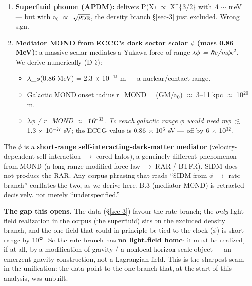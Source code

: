 \documentclass[aps,prd,preprint,nofootinbib,superscriptaddress]{revtex4-2}
\providecommand{\tightlist}{\setlength{\itemsep}{0pt}\setlength{\parskip}{0pt}}
\begin{document}
\begin{enumerate}
\def\labelenumi{\arabic{enumi}.}
\tightlist
\item
  \textbf{Superfluid phonon (APDM):} delivers P(X) \(\propto\)
  X\^{}\{3/2\} with \(\Lambda\) \(\sim\) meV
  \citep{Berezhiani:2015bqa, Berezhiani:2015pia} --- but with a\(_{0}\)
  \(\propto\) \(\sqrt{\rho_{\rm DE}}\), the density branch §\ref{sec-3}
  just excluded. Wrong sign.
\item
  \textbf{Mediator-MOND from ECCG's dark-sector scalar \(\phi\) (mass
  0.86 MeV):} a massive scalar mediates a Yukawa force of range
  \(\lambda\)\emph{\(\phi\) = ℏc/m}\(\phi\)c\(^{2}\). We derive
  numerically (D-3):

  \begin{itemize}
  \tightlist
  \item
    \(\lambda\)\_\(\phi\)(0.86 MeV) = 2.3 × 10\(^{-13}\) m --- a
    nuclear/contact range.
  \item
    Galactic MOND onset radius r\_MOND = \surd (GM/a\(_{0}\))
    \(\approx\) 3--11 kpc \(\approx\) 10\(^{20}\) m.
  \item
    \(\lambda\)\emph{\(\phi\) / r\_MOND \(\approx\)
    \textbf{10\(^{-33}\)}. To reach galactic range \(\phi\) would need
    m}\(\phi\) \(\lesssim\) 1.3 × 10\(^{-27}\) eV; the ECCG value is
    0.86 × 10\(^{6}\) eV --- off by 6 × 10\(^{32}\).
  \end{itemize}
\end{enumerate}

The \(\phi\) is a \textbf{short-range self-interacting-dark-matter
mediator} (velocity-dependent self-interaction \(\to\) cored halos), a
genuinely different phenomenon from MOND (a long-range modified force
law \(\to\) RAR / BTFR). SIDM does not produce the RAR. Any corpus
phrasing that reads ``SIDM from \(\phi\) \(\to\) rate branch'' conflates
the two, as we derive here. B.3 (mediator-MOND) is retracted decisively,
not merely ``underspecified.''

\textbf{The gap this opens.} The data (§\ref{sec-3}) favour the rate
branch; the \emph{only} light-field realization in the corpus (the
superfluid) sits on the excluded density branch, and the one field that
could in principle be tied to the clock (\(\phi\)) is short-range by
10\(^{33}\). So the rate branch has \textbf{no light-field home}: it
must be realized, if at all, by a modification of gravity / a nonlocal
horizon-scale object --- an emergent-gravity construction, not a
Lagrangian field. This is the sharpest seam in the unification: the data
point to the one branch that, at the start of this analysis, was
unbuilt.
\end{document}
